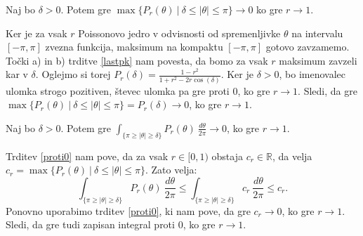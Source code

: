 \documentclass[mat1]{fmfdelo}
\begin{document}
    \begin{trditev}
        \label{proti0}
        Naj bo $\delta > 0$. Potem gre $\max\{P_r(\theta)~|~ \delta \leq |\theta| \leq \pi\} \to 0$ ko gre $r \to 1$.
    \end{trditev}
    \begin{dokaz}
        Ker je za vsak $r$ Poissonovo jedro v odvisnosti od spremenljivke $\theta$ na intervalu $[-\pi, \pi]$ zvezna funkcija, maksimum na kompaktu $[-\pi, \pi]$ gotovo zavzamemo. Točki a) in b) trditve \ref{lastpk} nam povesta, da bomo za vsak $r$ maksimum zavzeli kar v $\delta$. 
        Oglejmo si torej $P_r(\delta) = \frac{1 -r^2}{1 + r^2 - 2r \cos(\delta)}$. Ker je $\delta >0 $, bo imenovalec ulomka strogo pozitiven, števec ulomka pa gre proti $0$, ko gre $r \to 1$. 
        Sledi, da gre \mbox{$\max\{P_r(\theta)~|~ \delta \leq |\theta| \leq \pi\} = P_r(\delta) \to 0$}, ko gre $r \to 1$.
    \end{dokaz}
    \begin{posledica}
        \label{int_proti0}
        Naj bo $\delta > 0$. Potem gre ${\int_{\{\pi \geq |\theta| \geq \delta\}}{P_{r}(\theta)~\frac{d\theta}{2 \pi}}} \to 0$, ko gre $r \to 1$.
    \end{posledica}
    \begin{dokaz}
        Trditev \ref{proti0} nam pove, da za vsak $r \in [0,1)$ obstaja $c_r \in \mathbb{R}$, da velja $c_r = \max\{P_r(\theta)~|~ \delta \leq |\theta| \leq \pi\}$. Zato velja:
        $$
        {\int_{\{\pi \geq |\theta| \geq \delta\}}{P_{r}(\theta)~\frac{d\theta}{2 \pi}}} \leq {\int_{\{\pi \geq |\theta| \geq \delta\}}{c_r~\frac{d\theta}{2 \pi}}} \leq c_r.
        $$
        Ponovno uporabimo trditev \ref{proti0}, ki nam pove, da gre $c_r \to 0$, ko gre $r \to 1$. Sledi, da gre tudi zapisan integral proti $0$, ko gre $r \to 1$.
    \end{dokaz}
\end{document}
